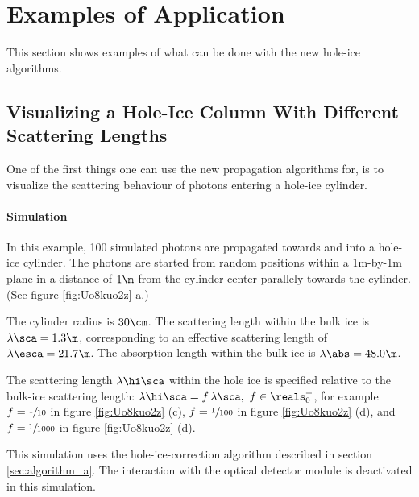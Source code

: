 
\section{Examples of Application}
\label{sec:applications}

This section shows examples of what can be done with the new hole-ice algorithms. 

\subsection{Visualizing a Hole-Ice Column With Different Scattering Lengths}
\label{sec:scattering_simulation}

One of the first things one can use the new propagation algorithms for, is to visualize the scattering behaviour of photons entering a hole-ice cylinder.

\paragraph{Simulation}
In this example, 100 simulated photons are propagated towards and into a hole-ice cylinder. The photons are started from random positions within a 1m-by-1m plane in a distance of $1\m$ from the cylinder center parallely towards the cylinder. (See figure \ref{fig:Uo8kuo2z} a.)

The cylinder radius is $30\cm$. The scattering length within the bulk ice is $\lambda\sca = 1.3\m$, corresponding to an effective scattering length of $\lambda\esca = 21.7\m$. The absorption length within the bulk ice is $\lambda\abs = 48.0\m$.

The scattering length $\lambda\hi\sca$ within the hole ice is specified relative to the bulk-ice scattering length: $\lambda\hi\sca = f\,\lambda\sca, \ f \in \reals_0^+$, for example $f = \sfrac{1}{10}$ in figure \ref{fig:Uo8kuo2z} (c), $f = \sfrac{1}{100}$ in figure \ref{fig:Uo8kuo2z} (d), and $f = \sfrac{1}{1000}$ in figure \ref{fig:Uo8kuo2z} (d).

This simulation uses the hole-ice-correction algorithm described in section \ref{sec:algorithm_a}. The interaction with the optical detector module is deactivated in this simulation.



